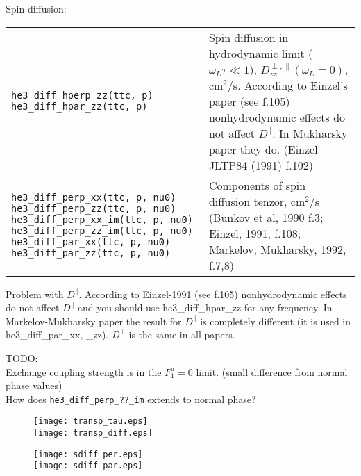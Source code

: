 \documentclass[a4paper]{article}
\begin{document}
Spin diffusion:

\medskip
\noindent\begin{tabular}{p{6cm}p{10cm}}
\tt he3\_diff\_hperp\_zz(ttc, p)\newline
\tt he3\_diff\_hpar\_zz(ttc, p)
& Spin diffusion in hydrodynamic limit ($\omega_L \tau \ll 1$),
  $D^{\perp,\parallel}_{zz}(\omega_L=0)$, cm$^2$/s. According to Einzel's
  paper (see f.105) nonhydrodynamic effects do not affect $D^\parallel$.
  In Mukharsky paper they do.\newline
  {(\small Einzel JLTP84 (1991) f.102)}\\

\tt he3\_diff\_perp\_xx(ttc, p, nu0)\newline
\tt he3\_diff\_perp\_zz(ttc, p, nu0)\newline
\tt he3\_diff\_perp\_xx\_im(ttc, p, nu0)\newline
\tt he3\_diff\_perp\_zz\_im(ttc, p, nu0)\newline
\tt he3\_diff\_par\_xx(ttc, p, nu0)\newline
\tt he3\_diff\_par\_zz(ttc, p, nu0)\newline
&Components of spin diffusion tenzor, cm$^2$/s\newline
{\small(Bunkov et al, 1990 f.3; Einzel, 1991, f.108;\newline
Markelov, Mukharsky, 1992, f.7,8)}\\
\end{tabular}
\medskip

Problem with $D^\parallel$. According to Einzel-1991 (see f.105)
nonhydrodynamic effects do not affect $D^\parallel$ and you should use
he3\_diff\_hpar\_zz for any frequency.
In Markelov-Mukharsky paper the result for $D^\parallel$ is completely
different (it is used in he3\_diff\_par\_xx, \_zz).
$D^\perp$ is the same in all papers.


\noindent TODO:\\
Exchange coupling strength is in the $F_1^a = 0$ limit. (small difference from normal phase values)\\
How does {\tt he3\_diff\_perp\_??\_im} extends to normal phase?\\

\begin{figure}[p]
\texttt{[image: transp\_tau.eps]}\\
\texttt{[image: transp\_diff.eps]}
\end{figure}

\begin{figure}[p]
\texttt{[image: sdiff\_per.eps]}\\
\texttt{[image: sdiff\_par.eps]}
\end{figure}
\end{document}
